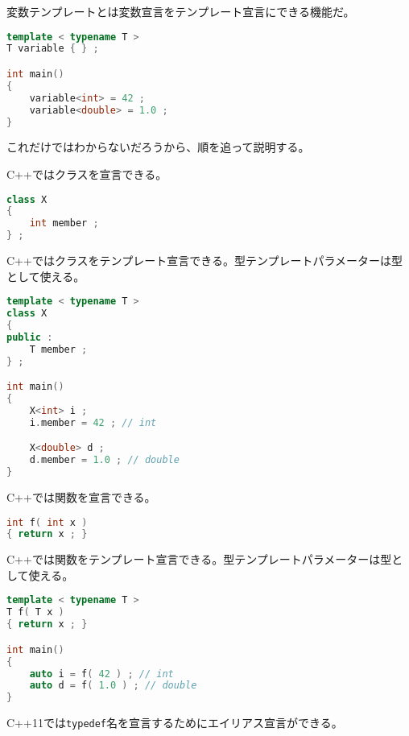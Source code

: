%

変数テンプレートとは変数宣言をテンプレート宣言にできる機能だ。

\begin{lstlisting}[language=C++]
template < typename T >
T variable { } ;

int main()
{
    variable<int> = 42 ;
    variable<double> = 1.0 ;
}
\end{lstlisting}

これだけではわからないだろうから、順を追って説明する。

C++ではクラスを宣言できる。

\begin{lstlisting}[language=C++]
class X
{
    int member ;
} ;
\end{lstlisting}

C++ではクラスをテンプレート宣言できる。型テンプレートパラメーターは型として使える。

\begin{lstlisting}[language=C++]
template < typename T >
class X
{
public :
    T member ;
} ;

int main()
{
    X<int> i ;
    i.member = 42 ; // int

    X<double> d ;
    d.member = 1.0 ; // double
}
\end{lstlisting}

C++では関数を宣言できる。

\begin{lstlisting}[language=C++]
int f( int x )
{ return x ; }
\end{lstlisting}

C++では関数をテンプレート宣言できる。型テンプレートパラメーターは型として使える。

\begin{lstlisting}[language=C++]
template < typename T >
T f( T x )
{ return x ; }

int main()
{
    auto i = f( 42 ) ; // int
    auto d = f( 1.0 ) ; // double
}
\end{lstlisting}

C++11では\lstinline!typedef!名を宣言するためにエイリアス宣言ができる。

